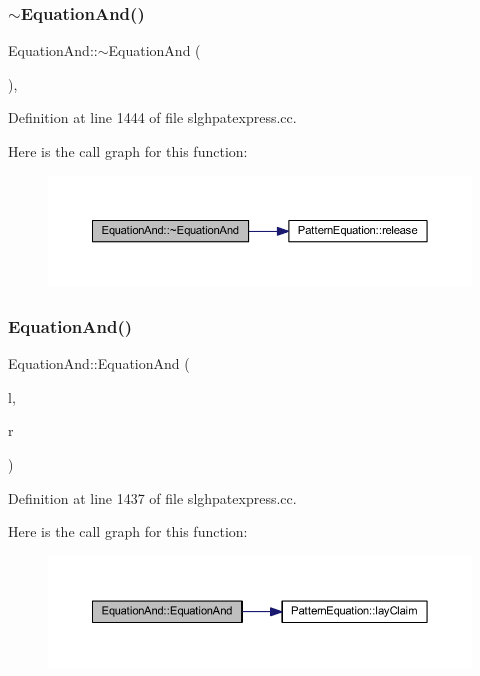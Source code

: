 \subsubsection{\texorpdfstring{$\sim$EquationAnd()}{~EquationAnd()}}
{\footnotesize\ttfamily Equation\+And\+::$\sim$\+Equation\+And (\begin{DoxyParamCaption}\item[{void}]{ }\end{DoxyParamCaption})\hspace{0.3cm}{\ttfamily [protected]}, {\ttfamily [virtual]}}



Definition at line 1444 of file slghpatexpress.\+cc.

Here is the call graph for this function\+:
\nopagebreak
\begin{figure}[H]
\begin{center}
\leavevmode
\includegraphics[width=350pt]{class_equation_and_af2a13c44c2896bf2d26263505ce91bb3_cgraph}
\end{center}
\end{figure}
\mbox{\label{class_equation_and_a136cacccbd9100cbb78ea25b44fc051a}} 
\subsubsection{\texorpdfstring{EquationAnd()}{EquationAnd()}}
{\footnotesize\ttfamily Equation\+And\+::\+Equation\+And (\begin{DoxyParamCaption}\item[{\mbox{\hyperlink{class_pattern_equation}{Pattern\+Equation}} $\ast$}]{l,  }\item[{\mbox{\hyperlink{class_pattern_equation}{Pattern\+Equation}} $\ast$}]{r }\end{DoxyParamCaption})}



Definition at line 1437 of file slghpatexpress.\+cc.

Here is the call graph for this function\+:
\nopagebreak
\begin{figure}[H]
\begin{center}
\leavevmode
\includegraphics[width=350pt]{class_equation_and_a136cacccbd9100cbb78ea25b44fc051a_cgraph}
\end{center}
\end{figure}


